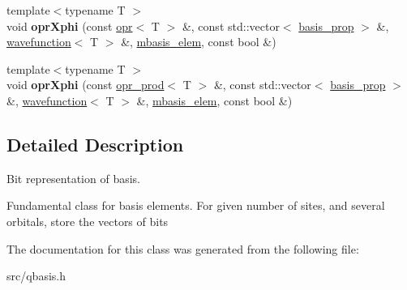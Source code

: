 \begin{DoxyCompactItemize}
\item 
\mbox{\label{classqbasis_1_1mbasis__elem_a29c6eee40d4c70b5acfb5c34203497df}} 
{\footnotesize template$<$typename T $>$ }\\void {\bfseries opr\+Xphi} (const \hyperlink{classqbasis_1_1opr}{opr}$<$ T $>$ \&, const std\+::vector$<$ \hyperlink{classqbasis_1_1basis__prop}{basis\+\_\+prop} $>$ \&, \hyperlink{classqbasis_1_1wavefunction}{wavefunction}$<$ T $>$ \&, \hyperlink{classqbasis_1_1mbasis__elem}{mbasis\+\_\+elem}, const bool \&)
\item 
\mbox{\label{classqbasis_1_1mbasis__elem_ace9e7f240f7e4f1d4ff4e328ef90dd21}} 
{\footnotesize template$<$typename T $>$ }\\void {\bfseries opr\+Xphi} (const \hyperlink{classqbasis_1_1opr__prod}{opr\+\_\+prod}$<$ T $>$ \&, const std\+::vector$<$ \hyperlink{classqbasis_1_1basis__prop}{basis\+\_\+prop} $>$ \&, \hyperlink{classqbasis_1_1wavefunction}{wavefunction}$<$ T $>$ \&, \hyperlink{classqbasis_1_1mbasis__elem}{mbasis\+\_\+elem}, const bool \&)
\end{DoxyCompactItemize}


\subsection{Detailed Description}
Bit representation of basis. 

Fundamental class for basis elements. For given number of sites, and several orbitals, store the vectors of bits 

The documentation for this class was generated from the following file\+:\begin{DoxyCompactItemize}
\item 
src/qbasis.\+h\end{DoxyCompactItemize}

